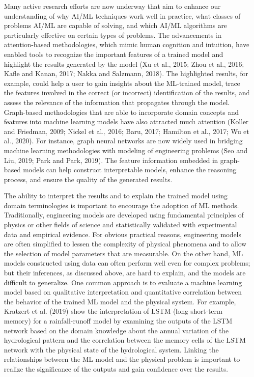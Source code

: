 Many active research efforts are now underway that aim to enhance our understanding of why AI/ML techniques work well in practice, what classes of problems AI/ML are capable of solving, and which AI/ML algorithms are particularly effective on certain types of problems. The advancements in attention-based methodologies, which mimic human cognition and intuition, have enabled tools to recognize the important features of a trained model and highlight the results generated by the model (Xu et al., 2015; Zhou et al., 2016; Kafle and Kanan, 2017; Nakka and Salzmann, 2018). The highlighted results, for example, could help a user to gain insights about the ML-trained model, trace the features involved in the correct (or incorrect) identification of the results, and assess the relevance of the information that propagates through the model. Graph-based methodologies that are able to incorporate domain concepts and features into machine learning models have also attracted much attention (Koller and Friedman, 2009; Nickel et al., 2016; Baru, 2017; Hamilton et al., 2017; Wu et al., 2020). For instance, graph neural networks are now widely used in bridging machine learning methodologies with modeling of engineering problems (Seo and Liu, 2019; Park and Park, 2019). The feature information embedded in graph-based models can help construct interpretable models, enhance the reasoning process, and ensure the quality of the generated results. 

The ability to interpret the results and to explain the trained model using domain terminologies is important to encourage the adoption of ML methods. Traditionally, engineering models are developed using fundamental principles of physics or other fields of science and statistically validated with experimental data and empirical evidence. For obvious practical reasons, engineering models are often simplified to lessen the complexity of physical phenomena and to allow the selection of model parameters that are measurable. On the other hand, ML models constructed using data can often perform well even for complex problems; but their inferences, as discussed above, are hard to explain, and the models are difficult to generalize. One common approach is to evaluate a machine learning model based on qualitative interpretation and quantitative correlation between the behavior of the trained ML model and the physical system. For example, Kratzert et al. (2019) show the interpretation of LSTM (long short-term memory) for a rainfall-runoff model by examining the outputs of the LSTM network based on the domain knowledge about the annual variation of the hydrological pattern and the correlation between the memory cells of the LSTM network with the physical state of the hydrological system. Linking the relationships between the ML model and the physical problem is important to realize the significance of the outputs and gain confidence over the results. 

